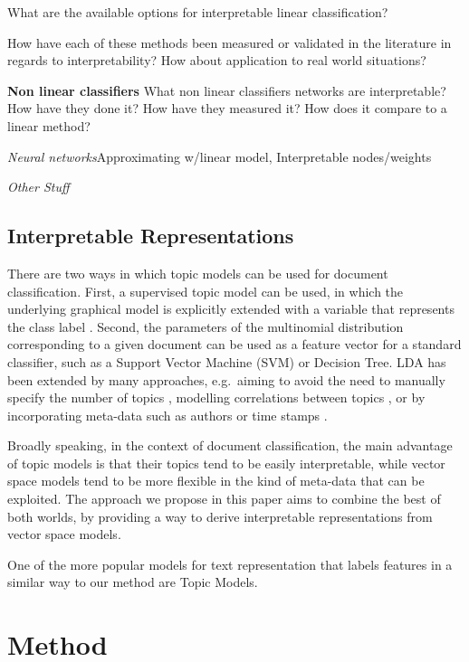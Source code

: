 What are the available options for interpretable linear classification?

How have each of these methods been measured or validated in the literature in regards to interpretability? How about application to real world situations?

\textbf{Non linear classifiers}
What non linear classifiers networks are interpretable? How have they done it? How have they measured it? How does it compare to a linear method?

\textit {Neural networks}Approximating w/linear model, Interpretable nodes/weights

\textit {Other Stuff}

\subsection{Interpretable Representations}


There are two ways in which topic models can be used for document classification. First, a supervised topic model can be used, in which the underlying graphical model is explicitly extended with a variable that represents the class label \cite{Blei2010}. Second, the parameters of the multinomial distribution corresponding to a given document can be used as a feature vector for a standard classifier, such as a Support Vector Machine (SVM) or Decision Tree. LDA has been extended by many approaches, e.g.\ aiming to avoid the need to manually specify the number of topics \cite{teh2005sharing}, modelling correlations between topics \cite{Blei2006}, or by incorporating meta-data such as authors \cite{rosen2004author} or time stamps \cite{wang2006topics}.


Broadly speaking, in the context of document classification, the main advantage of topic models is that their topics tend to be easily interpretable, while vector space models tend to be more flexible in the kind of meta-data that can be exploited. The approach we propose in this paper aims to combine the best of both worlds, by providing a way to derive interpretable representations from vector space models.

 One of the more popular models for text representation that labels features in a similar way to our method are Topic Models.


\section{Method}

